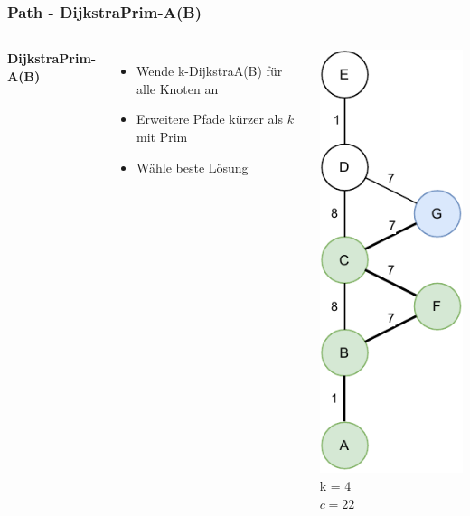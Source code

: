 \documentclass[aspectratio=169]{beamer}
\begin{document}


\begin{frame}
	\frametitle{Path - DijkstraPrim-A(B)}
	\begin{columns}[c] %
		
		\textbf{DijkstraPrim-A(B)}
		\begin{itemize}
			\item Wende k-DijkstraA(B) für alle Knoten an
			\item Erweitere Pfade kürzer als $k$ mit Prim
			\item Wähle beste Lösung
		\end{itemize}
		\includegraphics[scale=.6]{path_dijkstraAprim.pdf}
		k = 4\\
		$c = 22$
		
		
	\end{columns}
	\end{frame}
	
\end{document}
